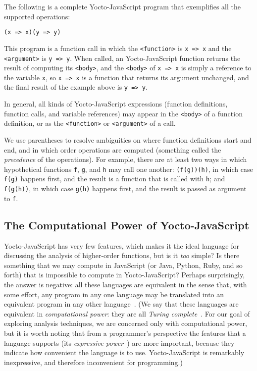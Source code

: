 \documentclass[12pt, oneside]{book}
\begin{document}
The following is a complete Yocto-JavaScript program that exemplifies all the supported operations:

\begin{verbatim}
(x => x)(y => y)
\end{verbatim}

This program is a function call in which the \verb!<function>! is \texttt{x => x} and the \verb!<argument>! is \texttt{y => y}. When called, an Yocto-JavaScript function returns the result of computing its \verb!<body>!, and the \verb!<body>! of \texttt{x => x} is simply a reference to the variable \texttt{x}, so \texttt{x => x} is a function that returns its argument unchanged, and the final result of the example above is \texttt{y => y}.

In general, all kinds of Yocto-JavaScript expressions (function definitions, function calls, and variable references) may appear in the \verb!<body>! of a function definition, or as the \verb!<function>! or \verb!<argument>! of a call.

We use parentheses to resolve ambiguities on where function definitions start and end, and in which order operations are computed (something called the \emph{precedence} of the operations). For example, there are at least two ways in which hypothetical functions \texttt{f}, \texttt{g}, and \texttt{h} may call one another: \texttt{(f(g))(h)}, in which case \texttt{f(g)} happens first, and the result is a function that is called with \texttt{h}; and \texttt{f(g(h))}, in which case \texttt{g(h)} happens first, and the result is passed as argument to \texttt{f}.

\subsection{The Computational Power of Yocto-JavaScript}
\label{The Computational Power of Yocto-JavaScript}

Yocto-JavaScript has very few features, which makes it the ideal language for discussing the analysis of higher-order functions, but is it \emph{too} simple? Is there something that we may compute in JavaScript (or Java, Python, Ruby, and so forth) that is impossible to compute in Yocto-JavaScript? Perhaps surprisingly, the answer is negative: all these languages are equivalent in the sense that, with some effort, any program in any one language may be translated into an equivalent program in any other language~\cite[§~6]{understanding-computation}. (We say that these languages are equivalent in \emph{computational power}: they are all \emph{Turing complete}~\cite[§~7]{understanding-computation}. For our goal of exploring analysis techniques, we are concerned only with computational power, but it is worth noting that from a programmer’s perspective the features that a language supports (its \emph{expressive power}~\cite{expressive-power}) are more important, because they indicate how convenient the language is to use. Yocto-JavaScript is remarkably inexpressive, and therefore inconvenient for programming.)
\end{document}
